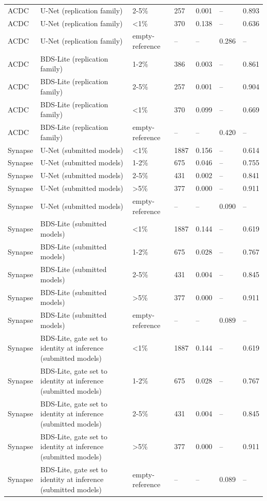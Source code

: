 \begin{tabular}{lllllll}
ACDC & U-Net (replication family) & 2-5\% & 257 & 0.001 & -- & 0.893 \\
ACDC & U-Net (replication family) & <1\% & 370 & 0.138 & -- & 0.636 \\
ACDC & U-Net (replication family) & empty-reference & -- & -- & 0.286 & -- \\
ACDC & BDS-Lite (replication family) & 1-2\% & 386 & 0.003 & -- & 0.861 \\
ACDC & BDS-Lite (replication family) & 2-5\% & 257 & 0.001 & -- & 0.904 \\
ACDC & BDS-Lite (replication family) & <1\% & 370 & 0.099 & -- & 0.669 \\
ACDC & BDS-Lite (replication family) & empty-reference & -- & -- & 0.420 & -- \\
Synapse & U-Net (submitted models) & <1\% & 1887 & 0.156 & -- & 0.614 \\
Synapse & U-Net (submitted models) & 1-2\% & 675 & 0.046 & -- & 0.755 \\
Synapse & U-Net (submitted models) & 2-5\% & 431 & 0.002 & -- & 0.841 \\
Synapse & U-Net (submitted models) & >5\% & 377 & 0.000 & -- & 0.911 \\
Synapse & U-Net (submitted models) & empty-reference & -- & -- & 0.090 & -- \\
Synapse & BDS-Lite (submitted models) & <1\% & 1887 & 0.144 & -- & 0.619 \\
Synapse & BDS-Lite (submitted models) & 1-2\% & 675 & 0.028 & -- & 0.767 \\
Synapse & BDS-Lite (submitted models) & 2-5\% & 431 & 0.004 & -- & 0.845 \\
Synapse & BDS-Lite (submitted models) & >5\% & 377 & 0.000 & -- & 0.911 \\
Synapse & BDS-Lite (submitted models) & empty-reference & -- & -- & 0.089 & -- \\
Synapse & BDS-Lite, gate set to identity at inference (submitted models) & <1\% & 1887 & 0.144 & -- & 0.619 \\
Synapse & BDS-Lite, gate set to identity at inference (submitted models) & 1-2\% & 675 & 0.028 & -- & 0.767 \\
Synapse & BDS-Lite, gate set to identity at inference (submitted models) & 2-5\% & 431 & 0.004 & -- & 0.845 \\
Synapse & BDS-Lite, gate set to identity at inference (submitted models) & >5\% & 377 & 0.000 & -- & 0.911 \\
Synapse & BDS-Lite, gate set to identity at inference (submitted models) & empty-reference & -- & -- & 0.089 & -- \\

\end{tabular}
